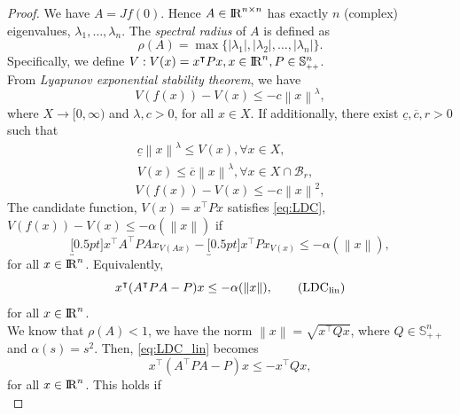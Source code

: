 \documentclass[a4paper,11pt,reqno]{amsart}
\newcommand{\R}{{\rm I\!R}}
\newcommand{\tran}{\intercal}
\newcommand{\smallplus}{{\scriptscriptstyle +}}
\newcommand{\Spp}{\mathbb{S}_{\smallplus\smallplus}}
\begin{document}
\begin{proof}
We have $A=Jf(0)$. Hence $A\in \R^{n\times n}$ has exactly $n$ (complex) eigenvalues, $\lambda_1,\ldots,\lambda_n$. The \textit{spectral radius} of $A$
is defined as
\begin{equation}
    \rho(A)=\max\{\left\lvert \lambda_1\right\rvert, \left\lvert \lambda_2\right\rvert,\ldots, \left\lvert \lambda_n\right\rvert \}.
\end{equation}
Specifically, we define $V: V(x)=x^{\tran}Px, x\in\R^n, P\in\Spp^n$.
\\
From \emph{Lyapunov exponential stability theorem}, we have
\begin{equation}
    V(f(x))-V(x)\leq-c\left\lVert x\right\rVert^{\lambda},\tag{LDC}
    \label{eq:LDC}
\end{equation}
where $X\rightarrow [0,\infty)$ and $\lambda,c>0$, for all $x\in X$. If additionally, there exist $\underline{c}, \overline{c}, r > 0$ such that
\begin{align}
    \underline{c}\left\lVert x\right\rVert^{\lambda}\leq V(x), \forall x\in X,\tag{GLB}&
    \label{eq:GLB}
    \\
    V(x)\leq\overline{c}\left\lVert x\right\rVert^{\lambda}, \forall x\in X\cap\mathcal{B}_r,\tag{LUB}&
    \label{eq:LUB}
\end{align}
\begin{equation}
    V(f(x))-V(x)\leq-c\left\lVert x\right\rVert^{2},
\end{equation}
The candidate function, $V(x)=x^{\tran}Px$ satisfies \eqref{eq:LDC}, $V(f(x))-V(x)\leq-\alpha(\left\lVert x\right\rVert)$ if
\begin{equation}
    \underbracket[0.5pt]{x^{\tran}A^{\tran}PAx}_{V(Ax)}-\underbracket[0.5pt]{x^{\tran}Px}_{V(x)}\leq-\alpha(\left\lVert x\right\rVert),
\end{equation}
for all $x\in\R^n$. Equivalently,
\begin{equation}
    x^{\tran}(A^{\tran}PA-P)x\leq-\alpha(\left\lVert x\right\rVert), \tag{LDC$_{\mathrm{lin}}$}
    \label{eq:LDC_lin}
\end{equation}
for all $x\in\R^n$.\\
We know that $\rho(A)<1$, we have the norm $\left\lVert x\right\rVert=\sqrt{x^{\tran}Qx}$, where $Q\in\Spp^n$ and $\alpha(s)=s^2$. Then, \eqref{eq:LDC_lin} becomes
\begin{equation}
    x^{\tran}(A^{\tran}PA-P)x\leq -x^{\tran}Qx,
\end{equation}
for all $x\in\R^n$. This holds if
\begin{equation}

\end{equation}
\end{proof}
\end{document}

